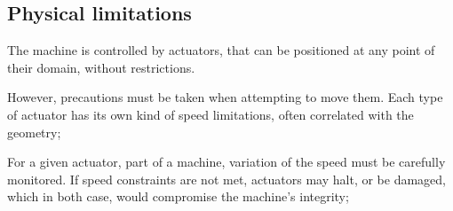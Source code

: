 \subsection{Physical limitations}

The machine is controlled by actuators, that can be positioned at any point of their domain, without restrictions.
\newline

However, precautions must be taken when attempting to move them. Each type of actuator has its own kind of speed
limitations, often correlated with the geometry;\newline

For a given actuator, part of a machine, variation of the speed must be carefully monitored.
If speed constraints are not met, actuators may halt, or be damaged, which in both case, would compromise the
machine's integrity;\newline

